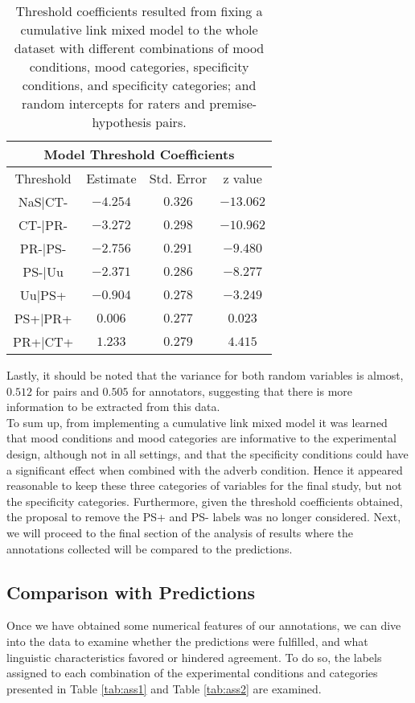 \begin{table}
\centering
\begin{tabular}{|c|c|c|c|}
\hline
\multicolumn{4}{|c|}{Model Threshold Coefficients}\\\hline
Threshold &  Estimate & Std. Error & z value\\\hline
NaS|CT- & $-4.254$ & $0.326$ & $-13.062$\\\hline
CT-|PR- & $-3.272$ & $0.298$ & $-10.962$\\\hline
PR-|PS- & $-2.756$ & $0.291$ & $ -9.480$\\\hline
PS-|Uu  & $-2.371$ & $0.286$ & $ -8.277$\\\hline
Uu|PS+  & $-0.904$ & $0.278$ & $ -3.249$\\\hline
PS+|PR+ & $ 0.006$ & $0.277$ & $  0.023$\\\hline
PR+|CT+ & $ 1.233$ & $0.279$ & $  4.415$\\\hline
\end{tabular}
\caption[Threshold coefficients.]{Threshold coefficients resulted from fixing a cumulative link mixed model to the whole dataset with different combinations of mood conditions, mood categories, specificity conditions, and specificity categories; and random intercepts for raters and premise-hypothesis pairs.}
\label{tab:modthres}
\end{table}

Lastly, it should be noted that the variance for both random variables is almost, $0.512$ for pairs and $0.505$ for annotators, suggesting that there is more information to be extracted from this data.\\

To sum up, from implementing a cumulative link mixed model it was learned that mood conditions and mood categories are informative to the experimental design, although not in all settings, and that the specificity conditions could have a significant effect when combined with the adverb condition. Hence it appeared reasonable to keep these three categories of variables for the final study, but not the specificity categories. Furthermore, given the threshold coefficients obtained, the proposal to remove the PS+ and PS- labels was no longer considered. Next, we will proceed to the final section of the analysis of results where the annotations collected will be compared to the predictions.\\

\subsection{Comparison with Predictions}
\label{subsec:pilcompred}
Once we have obtained some numerical features of our annotations, we can dive into the data to examine whether the predictions were fulfilled, and what linguistic characteristics favored or hindered agreement. To do so, the labels assigned to each combination of the experimental conditions and categories presented in Table \ref{tab:ass1} and Table \ref{tab:ass2} are examined.\\

